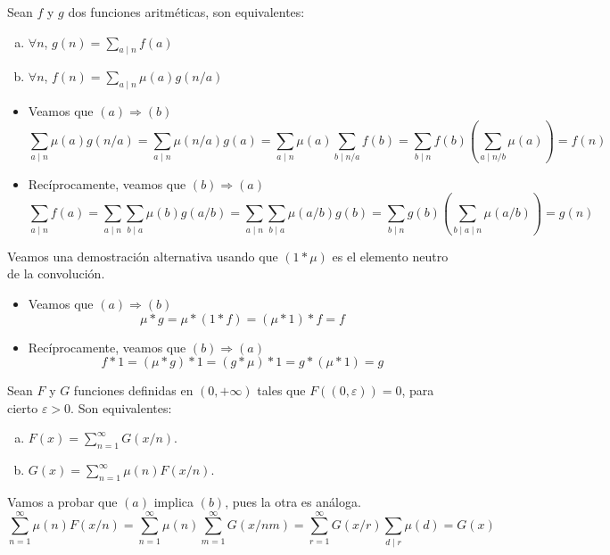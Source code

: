 \documentclass[TAN.tex]{subfiles}
\begin{document}
\begin{prop}
Sean $f$ y $g$ dos funciones aritméticas, son equivalentes:
\begin{enumerate}[(a)]
	\item $\forall n$, $g(n) = \sum_{a\mid n} f(a)$
	\item $\forall n$, $f(n) = \sum_{a\mid n}μ(a) g(n/a)$
\end{enumerate}
\end{prop}
\newpage
\begin{dem}\mbox{}
\begin{itemize}
	\item Veamos que $(a) \Rightarrow (b)$
	\[
	\sum_{a\mid n} μ(a)g(n/a) = \sum_{a\mid n}μ(n/a)g(a) = \sum_{a\mid n}μ(a) \sum_{b\mid n/a} f(b) = \sum_{b\mid n}f(b)\left(\sum_{a\mid n/b} μ(a)\right) = f(n)
	\]
	\item Recíprocamente, veamos que  $(b) \Rightarrow (a)$
	\[
	\sum_{a\mid n}f(a) = \sum_{a\mid n} \sum_{b\mid a} μ(b)g(a/b) = \sum_{a\mid n}\sum_{b\mid a} μ(a/b)g(b) = \sum_{b\mid n}g(b)\left(\sum_{b\mid a\mid n}μ(a/b)\right) = g(n)
	\]
\end{itemize}
Veamos una demostración alternativa usando que $(1\ast \mu)$ es el elemento neutro de la convolución.
\begin{itemize}
\item Veamos que $(a) \Rightarrow (b)$
	$$
	\mu \ast g = \mu \ast (1 \ast f) = (\mu \ast 1)\ast f= f
	$$
	\item Recíprocamente, veamos que  $(b) \Rightarrow (a)$
	\[
	f \ast 1 = (\mu \ast g) \ast 1 = (g\ast \mu) \ast 1 = g \ast (\mu \ast 1) = g
	\]
\end{itemize}
\end{dem}

\begin{prop}
Sean $F$ y $G$ funciones definidas en $(0,+∞)$ tales que $F((0,\varepsilon))=0$, para cierto $\varepsilon > 0$. Son equivalentes:
\begin{enumerate}[(a)]
\item $F(x) = \sum_{n=1}^{∞} G(x/n)$.
\item $G(x) = \sum_{n=1}^{∞} μ(n) F(x/n)$.
\end{enumerate}
\begin{dem}
Vamos a probar que $(a)$ implica $(b)$, pues la otra es análoga.
$$
\sum_{n=1}^{∞} μ(n) F(x/n) = \sum_{n=1}^{∞} μ(n) \sum_{m=1}^{∞} G(x/nm) = \sum_{r=1}^{∞} G(x/r) \sum_{d\mid r} \mu(d) = G(x)
$$
\end{dem}
\end{prop}
\end{document}
